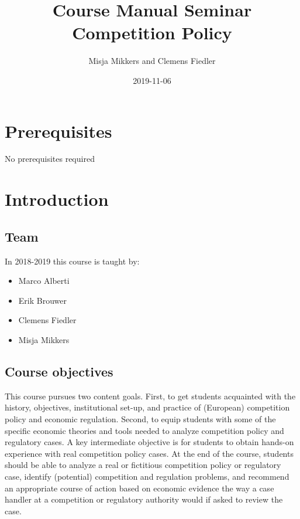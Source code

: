 \documentclass[]{book}
\title{Course Manual Seminar Competition Policy}
\author{Misja Mikkers and Clemens Fiedler}
\date{2019-11-06}
\providecommand{\tightlist}{%
  \setlength{\itemsep}{0pt}\setlength{\parskip}{0pt}}
\begin{document}
\maketitle

{
\setcounter{tocdepth}{1}
\tableofcontents
}
\chapter{Prerequisites}\label{prerequisites}

No prerequisites required

\chapter{Introduction}\label{intro}

\section{Team}\label{team}

In 2018-2019 this course is taught by:

\begin{itemize}
\tightlist
\item
  Marco Alberti
\item
  Erik Brouwer
\item
  Clemens Fiedler
\item
  Misja Mikkers
\end{itemize}

\section{Course objectives}\label{course-objectives}

This course pursues two content goals. First, to get students acquainted
with the history, objectives, institutional set-up, and practice of
(European) competition policy and economic regulation. Second, to equip
students with some of the specific economic theories and tools needed to
analyze competition policy and regulatory cases. A key intermediate
objective is for students to obtain hands-on experience with real
competition policy cases. At the end of the course, students should be
able to analyze a real or fictitious competition policy or regulatory
case, identify (potential) competition and regulation problems, and
recommend an appropriate course of action based on economic evidence the
way a case handler at a competition or regulatory authority would if
asked to review the case.
\end{document}
